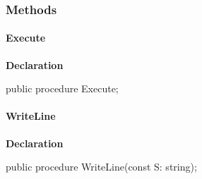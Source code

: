 \documentclass{report}
\newif\ifpdf
\begin{document}
\subsubsection*{\large{\textbf{Methods}}\normalsize\hspace{1ex}\hfill}
\paragraph*{Execute}\hspace*{\fill}

\label{PasDoc_ProcessLineTalk.TProcessLineTalk-Execute}
\begin{list}{}{
\setlength{\itemindent}{0cm}
\setlength{\listparindent}{0cm}
\setlength{\leftmargin}{\evensidemargin}
\addtolength{\leftmargin}{\tmplength}
\settowidth{\labelsep}{X}
\addtolength{\leftmargin}{\labelsep}
\setlength{\labelwidth}{\tmplength}
}
\item[\textbf{Declaration}\hfill]
\ifpdf
\begin{flushleft}
\fi
\begin{ttfamily}
public procedure Execute;\end{ttfamily}

\ifpdf
\end{flushleft}
\fi

\end{list}
\paragraph*{WriteLine}\hspace*{\fill}

\label{PasDoc_ProcessLineTalk.TProcessLineTalk-WriteLine}
\begin{list}{}{
\setlength{\itemindent}{0cm}
\setlength{\listparindent}{0cm}
\setlength{\leftmargin}{\evensidemargin}
\addtolength{\leftmargin}{\tmplength}
\settowidth{\labelsep}{X}
\addtolength{\leftmargin}{\labelsep}
\setlength{\labelwidth}{\tmplength}
}
\item[\textbf{Declaration}\hfill]
\ifpdf
\begin{flushleft}
\fi
\begin{ttfamily}
public procedure WriteLine(const S: string);\end{ttfamily}

\ifpdf
\end{flushleft}
\fi

\end{list}
\end{document}
